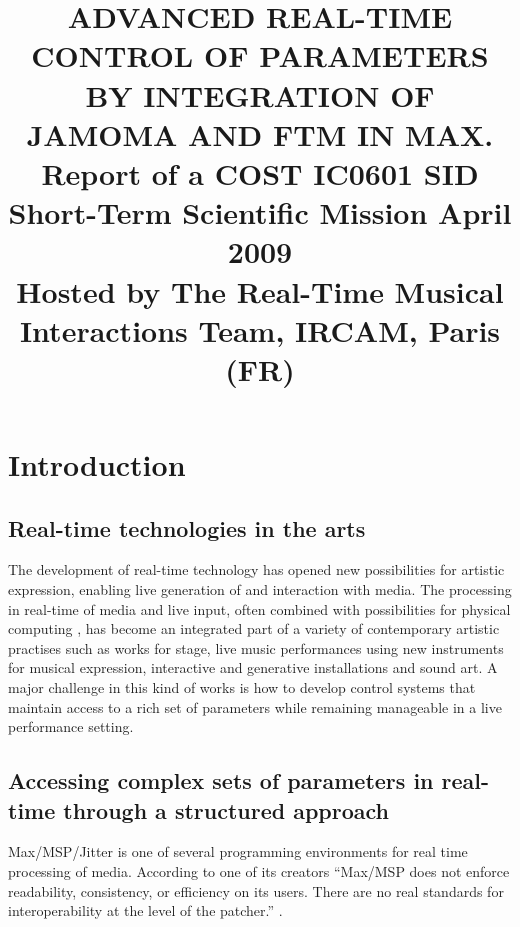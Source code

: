 \documentclass{article}
\title{ADVANCED REAL-TIME CONTROL OF PARAMETERS \\BY INTEGRATION OF JAMOMA AND FTM IN MAX.\\
Report of a COST IC0601 SID Short-Term Scientific Mission April 2009 \\Hosted by The Real-Time Musical Interactions Team, IRCAM, Paris (FR)}
\begin{document}
%    
\sloppy
\maketitle
%

\permission

\begin{abstract}  



\end{abstract}

\section{Introduction}\label{sec:introduction}        


\subsection{Real-time technologies in the arts}

The development of real-time technology has opened new possibilities for artistic expression, enabling live generation of and interaction with media. The processing in real-time of media and live input, often combined with possibilities for physical computing \cite{Sullivan_2004_physical_computing}, has become an integrated part of a variety of contemporary artistic practises such as works for stage, live music performances using new instruments for musical expression, interactive and generative installations and sound art. A major challenge in this kind of works is how to develop control systems that maintain access to a rich set of parameters while remaining manageable in a live performance setting.

\subsection{Accessing complex sets of parameters in real-time through a structured approach}

Max/MSP/Jitter is one of several programming environments for real time processing of media. According to one of its creators ``Max/MSP does not enforce readability, consistency, or efficiency on its users. There are no real standards for interoperability at the level of the patcher.'' \cite{Zicarelli:2002_program_that_do_nothing}.
\end{document}
